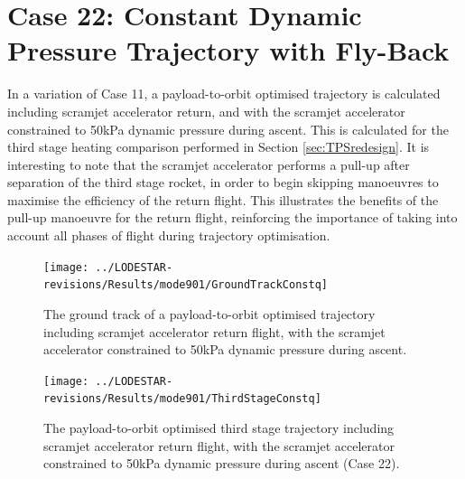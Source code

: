 \section{Case 22: Constant Dynamic Pressure Trajectory with Fly-Back}\label{sec:constqReturn}
In a variation of Case 11, a payload-to-orbit optimised trajectory is calculated including scramjet accelerator return, and with the scramjet accelerator constrained to 50kPa dynamic pressure during ascent. This is calculated for the third stage heating comparison performed in Section \ref{sec:TPSredesign}. It is interesting to note that the scramjet accelerator performs a pull-up after separation of the third stage rocket, in order to begin skipping manoeuvres to maximise the efficiency of the return flight. This illustrates the benefits of the pull-up manoeuvre for the return flight, reinforcing the importance of taking into account all phases of flight during trajectory optimisation. 
\begin{figure}[!h]
\centering
\texttt{[image: ../LODESTAR-revisions/Results/mode901/GroundTrackConstq]}
\caption{The ground track of a payload-to-orbit optimised trajectory including scramjet accelerator return flight, with the scramjet accelerator constrained to 50kPa dynamic pressure during ascent.}
\label{fig:GroundTrackConstqReturn}
\end{figure}
\begin{figure}[!h]
\centering
\texttt{[image: ../LODESTAR-revisions/Results/mode901/ThirdStageConstq]}
\caption{The payload-to-orbit optimised third stage trajectory including scramjet accelerator return flight, with the scramjet accelerator constrained to 50kPa dynamic pressure during ascent (Case 22).}
\label{fig:ThirdStageConstqReturn}
\end{figure}

